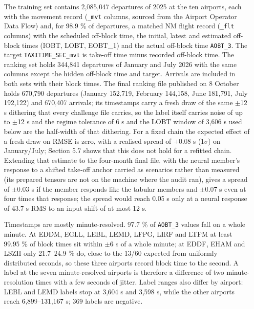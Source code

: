 \documentclass[
  manuscript=article,  %
  layout=preprint,     %
  year=2026,
  volume=4,
]{extra/joas}
\begin{document}
The training set contains 2,085,047 departures of 2025 at the ten airports, each with the movement record (\texttt{\_\allowbreak{}mvt} columns, sourced from the Airport Operator Data Flow) and, for 98.9 \% of departures, a matched NM flight record (\texttt{\_\allowbreak{}flt} columns) with the scheduled off-block time, the initial, latest and estimated off-block times (IOBT, LOBT, EOBT\_1) and the actual off-block time \texttt{AOBT\_\allowbreak{}3}. The target \texttt{TAXITIME\_\allowbreak{}SEC\_\allowbreak{}mvt} is take-off time minus recorded off-block time. The ranking set holds 344,841 departures of January and July 2026 with the same columns except the hidden off-block time and target. Arrivals are included in both sets with their block times. The final ranking file published on 8 October holds 670,790 departures (January 152,719, February 144,158, June 181,791, July 192,122) and 670,407 arrivals; its timestamps carry a fresh draw of the same $\pm$12 s dithering that every challenge file carries, so the label itself carries noise of up to $\pm$12 s and the regime tolerance of 6 s and the LOBT window of 3,606 s used below are the half-width of that dithering. For a fixed chain the expected effect of a fresh draw on RMSE is zero, with a realised spread of $\pm$0.08 s (1$\sigma$) on January/July; Section 5.7 shows that this does not hold for a refitted chain. Extending that estimate to the four-month final file, with the neural member's response to a shifted take-off anchor carried as scenarios rather than measured (its prepared tensors are not on the machine where the audit ran), gives a spread of $\pm$0.03 s if the member responds like the tabular members and $\pm$0.07 s even at four times that response; the spread would reach 0.05 s only at a neural response of 43.7 s RMS to an input shift of at most 12 s.

Timestamps are mostly minute-resolved. 97.7 \% of \texttt{AOBT\_\allowbreak{}3} values fall on a whole minute. At EDDM, EGLL, LEBL, LEMD, LFPG, LIRF and LTFM at least 99.95 \% of block times sit within $\pm$6 s of a whole minute; at EDDF, EHAM and LSZH only 21.7--24.9 \% do, close to the 13/60 expected from uniformly distributed seconds, so these three airports record block time to the second. A label at the seven minute-resolved airports is therefore a difference of two minute-resolution times with a few seconds of jitter. Label ranges also differ by airport: LEBL and LEMD labels stop at 3,604 s and 3,598 s, while the other airports reach 6,899--131,167 s; 369 labels are negative.
\end{document}
